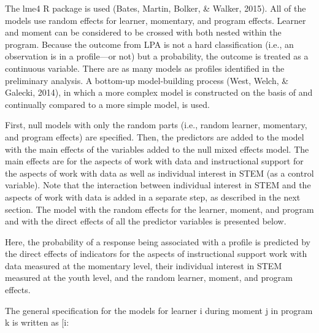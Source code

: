 \documentclass[]{book}
\theoremstyle{definition}
\theoremstyle{definition}
\theoremstyle{definition}
\theoremstyle{remark}
\begin{document}
The lme4 R package is used (Bates, Martin, Bolker, \& Walker, 2015). All
of the models use random effects for learner, momentary, and program
effects. Learner and moment can be considered to be crossed with both
nested within the program. Because the outcome from LPA is not a hard
classification (i.e., an observation is in a profile---or not) but a
probability, the outcome is treated as a continuous variable. There are
as many models as profiles identified in the preliminary analysis. A
bottom-up model-building process (West, Welch, \& Galecki, 2014), in
which a more complex model is constructed on the basis of and
continually compared to a more simple model, is used.

First, null models with only the random parts (i.e., random learner,
momentary, and program effects) are specified. Then, the predictors are
added to the model with the main effects of the variables added to the
null mixed effects model. The main effects are for the aspects of work
with data and instructional support for the aspects of work with data as
well as individual interest in STEM (as a control variable). Note that
the interaction between individual interest in STEM and the aspects of
work with data is added in a separate step, as described in the next
section. The model with the random effects for the learner, moment, and
program and with the direct effects of all the predictor variables is
presented below.

Here, the probability of a response being associated with a profile is
predicted by the direct effects of indicators for the aspects of
instructional support work with data measured at the momentary level,
their individual interest in STEM measured at the youth level, and the
random learner, moment, and program effects.

The general specification for the models for learner i during moment j
in program k is written as {[}i:
\end{document}

